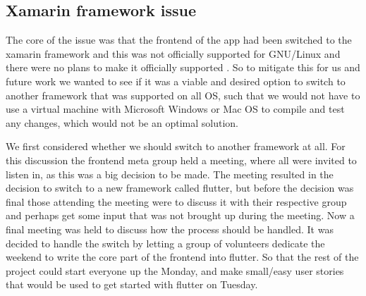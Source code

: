 \subsection{Xamarin framework issue}
The core of the issue was that the frontend of the app had been switched to the xamarin framework and this was not officially supported for GNU/Linux and there were no plans to make it officially supported \cite{xamarinSupport} \cite{xamarinSupport2}.
So to mitigate this for us and future work we wanted to see if it was a viable and desired option to switch to another framework that was supported on all OS, such that we would not have to use a virtual machine with Microsoft Windows or Mac OS to compile and test any changes, which would not be an optimal solution.

We first considered whether we should switch to another framework at all.
For this discussion the frontend meta group held a meeting, where all were invited to listen in, as this was a big decision to be made.
The meeting resulted in the decision to switch to a new framework called flutter, but before the decision was final those attending the meeting were to discuss it with their respective group and perhaps get some input that was not brought up during the meeting.
Now a final meeting was held to discuss how the process should be handled.
It was decided to handle the switch by letting a group of volunteers dedicate the weekend to write the core part of the frontend into flutter. So that the rest of the project could start everyone up the Monday, and make small/easy user stories that would be used to get started with flutter on Tuesday.
